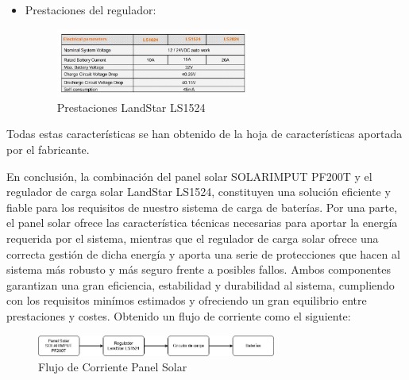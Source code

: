 \begin{itemize}
    \item Prestaciones del regulador:
    \begin{figure}[H]
        \centering
        \includegraphics[width=0.6\textwidth]{images/2-hardware/Panel Solar/Regulador.png}
        \caption{Prestaciones LandStar LS1524}
        \label{fig:4-1-2-Regulador}
    \end{figure}
\end{itemize}

Todas estas características se han obtenido de la hoja de características aportada por el fabricante.

En conclusión, la combinación del panel solar SOLARIMPUT PF200T y el regulador de carga solar LandStar LS1524, constituyen una solución eficiente y fiable para los requisitos de nuestro sistema de carga de baterías. Por una parte, el panel solar ofrece las característica técnicas necesarias para aportar la energía requerida por el sistema, mientras que el regulador de carga solar ofrece una correcta gestión de dicha energía y aporta una serie de protecciones que hacen al sistema más robusto y más seguro frente a posibles fallos. Ambos componentes garantizan una gran eficiencia, estabilidad y durabilidad al sistema, cumpliendo con los requisitos minímos estimados y ofreciendo un gran equilibrio entre prestaciones y costes. Obtenido un flujo de corriente como el siguiente:

\begin{figure}[H]
    \centering
    \includegraphics[width=0.7\textwidth]{images/2-hardware/Panel Solar/DiagramaBloquesPanel.jpg}
    \caption{Flujo de Corriente Panel Solar}
    \label{fig:4-1-2-FlujoCorrientePanel}
\end{figure}

